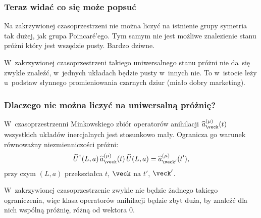 \documentclass[10pt,t]{beamer}
\begin{document}
\begin{frame}
  \frametitle{Teraz widać co się może popsuć}


  Na zakrzywionej czasoprzestrzeni nie można liczyć na istnienie grupy
  symetria tak dużej, jak grupa Poincar\'{e}’ego. Tym samym nie jest
  możliwe znalezienie stanu próżni który jest wszędzie pusty. Bardzo
  dziwne.

  W~zakrzywionej czasoprzestrzeni takiego uniwersalnego stanu próżni
  nie da~się zwykle znaleźć, w~jednych układach będzie pusty w~innych
  nie. To w~istocie leży u~podstaw słynnego promieniowania czarnych
  dziur (miało dobry marketing).

\end{frame}





\begin{frame}
  \frametitle{Dlaczego nie można liczyć na uniwersalną próżnię?}


  W~czasoprzestrzenni Minkowskiego zbiór operatorów anihilacji
  $\widehat{a}^{ ( \mu ) }_{ \veck }( t )$ wszystkich układów
  inercjalnych jest stosunkowo mały. Ogranicza go warunek równoważny
  niezmienniczości próżni:
  \begin{equation}
    \label{eq:Niespodziewane-teoretyczne-11}
    \widehat{U}^{ \dagger }( L, a ) \, \widehat{a}^{ ( \mu ) }_{ \veck }( t ) \,
    \widehat{U}( L, a )
    =
    \widehat{a}^{ ( \mu ) }_{ \veck' }( t' ),
  \end{equation}
  przy czym $( L, a )$ przekształca $t$, $\veck$ na $t'$, $\veck'$.

  W~zakrzywionej czasoprzestrzenie zwykle nie będzie żadnego takiego
  ograniczenia, więc klasa operatorów anihilacji będzie zbyt duża, by
  znaleźć dla nich wspólną próżnię, różną od wektora $0$.

\end{frame}
\end{document}
